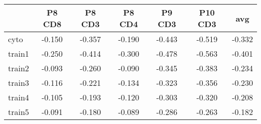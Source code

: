 \begin{tabular}{lcccccc}
   \hline  &P8 CD8& P8 CD3& P8 CD4& P9 CD3& P10 CD3& avg\\ 
\hline
cyto & -0.150 & -0.357 & -0.190 & -0.443 & -0.519 & -0.332 \\ 
  train1 & -0.250 & -0.414 & -0.300 & -0.478 & -0.563 & -0.401 \\ 
  train2 & -0.093 & -0.260 & -0.090 & -0.345 & -0.383 & -0.234 \\ 
  train3 & -0.116 & -0.221 & -0.134 & -0.323 & -0.356 & -0.230 \\ 
  train4 & -0.105 & -0.193 & -0.120 & -0.303 & -0.320 & -0.208 \\ 
  train5 & -0.091 & -0.180 & -0.089 & -0.286 & -0.263 & -0.182 \\ 
   \hline
\end{tabular}
